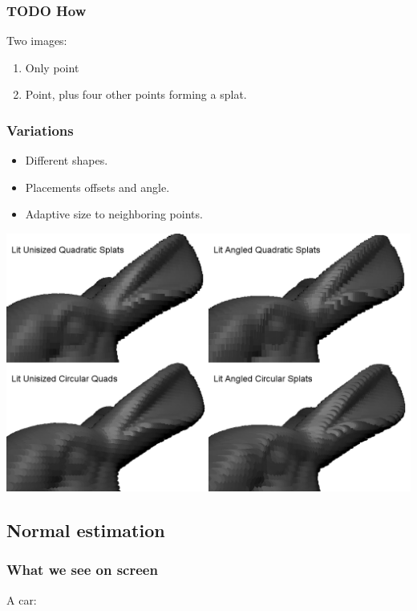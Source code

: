 \documentclass[11pt]{article}
\begin{document}
\subsubsection*{{\bfseries\sffamily TODO} How}
\label{sec:orgd0ff1ef}
Two images:
\begin{enumerate}
\item Only point
\item Point, plus four other points forming a splat.
\end{enumerate}

\subsubsection*{Variations}
\label{sec:orgc0b4141}
\begin{itemize}
\item Different shapes.
\item Placements offsets and angle.
\item Adaptive size to neighboring points.
\end{itemize}
\begin{center}
\includegraphics[width=.9\linewidth]{./images/Presentation_Splat_Variations.png}
\end{center}

\subsection*{Normal estimation}
\label{sec:orge678bd9}
\subsubsection*{What we see on screen}
\label{sec:org53a9bad}
A car:
\end{document}
